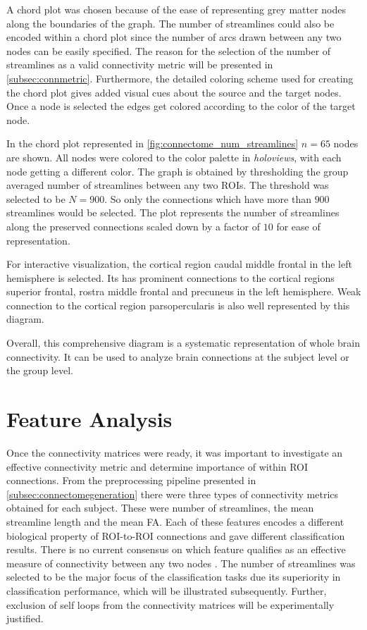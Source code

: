 \documentclass[msthesis.tex]{subfiles}
\begin{document}
A chord plot was chosen because of the ease of representing grey matter nodes along the boundaries of the graph. The number of streamlines could also be encoded within a chord plot since the number of arcs drawn between any two nodes can be easily specified. The reason for the selection of the number of streamlines as a valid connectivity metric will be presented in \autoref{subsec:connmetric}. Furthermore, the detailed coloring scheme used for creating the chord plot gives added visual cues about the source and the target nodes. Once a node is selected the edges get colored according to the color of the target node.

In the chord plot represented in \autoref{fig:connectome_num_streamlines} $n=65$ nodes are shown. All nodes were colored to the color palette in \textit{holoviews}, with each node getting a different color. The graph is obtained by thresholding the group averaged number of streamlines between any two ROIs. The threshold was selected to be $N=900$. So only the connections which have more than $900$ streamlines would be selected. The plot represents the number of streamlines along the preserved connections scaled down by a factor of $10$ for ease of representation.

For interactive visualization, the cortical region caudal middle frontal in the left hemisphere is selected. Its has prominent connections to the cortical regions superior frontal, rostra middle frontal and precuneus in the left hemisphere. Weak connection to the cortical region parsopercularis is also well represented by this diagram. 

Overall, this comprehensive diagram is a systematic representation of whole brain connectivity. It can be used to analyze brain connections at the subject level or the group level.

\section{Feature Analysis}
\label{features}
Once the connectivity matrices were ready, it was important to investigate an effective connectivity metric and determine importance of within ROI connections. From the preprocessing pipeline presented in \autoref{subsec:connectomegeneration} there were three types of connectivity metrics obtained for each subject. These were number of streamlines, the mean streamline length and the mean FA. Each of these features encodes a different biological property of ROI-to-ROI connections and gave different classification results. There is no current consensus on which feature qualifies as an effective measure of connectivity between any two nodes \citep{yeh2020mapping}. The number of streamlines was selected to be the major focus of the classification tasks due its superiority in classification performance, which will be illustrated subsequently. Further, exclusion of self loops from the connectivity matrices will be experimentally justified. 
\end{document}
